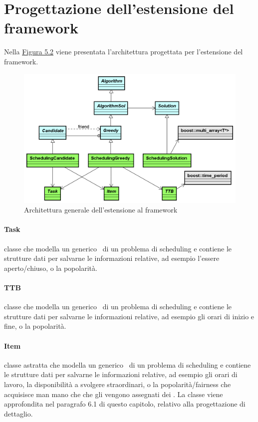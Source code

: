 \section{Progettazione dell'estensione del framework}
Nella \hyperref[fig52]{Figura 5.2} viene presentata l'architettura progettata per l'estensione del framework.
\begin{figure}[!h]
    \label{fig52}
    \begin{widepage}
        \includegraphics[width=14.9cm,keepaspectratio]{../immagini/progettazione/estensione.png}
        \caption{Architettura generale dell'estensione al framework}
    \end{widepage}
\end{figure}
\FloatBarrier
\noindent
\paragraph{Task} classe che modella un generico \task\ di un problema di scheduling e contiene le strutture dati per salvarne le informazioni relative, ad esempio l'essere aperto/chiuso, o la popolarità.
\paragraph{TTB} classe che modella un generico \ttb\ di un problema di scheduling e contiene le strutture dati per salvarne le informazioni relative, ad esempio gli orari di inizio e fine, o la popolarità.
\paragraph{Item} classe astratta che modella un generico \items\ di un problema di scheduling e contiene le strutture dati per salvarne le informazioni relative, ad esempio gli orari di lavoro, la disponibilità a svolgere straordinari, o la popolarità/fairness che acquisisce man mano che che gli vengono assegnati dei \task. La classe viene approfondita nel paragrafo 6.1 di questo capitolo, relativo alla progettazione di dettaglio.
